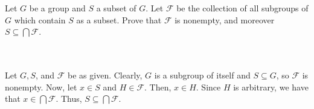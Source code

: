 Let $G$ be a group and $S$ a subset of $G$. Let $\mathcal{F}$ be the collection of all subgroups of $G$
which contain $S$ as a subset. Prove that $\mathcal{F}$ is nonempty, and moreover
$S\subseteq\bigcap\mathcal{F}$.\\\\

\begin{solution}\renewcommand{\qedsymbol}{}\ \\
    Let $G, S$, and $\mathcal{F}$ be as given. Clearly, $G$ is a subgroup of itself and $S\subseteq G$,
    so $\mathcal{F}$ is nonempty. Now, let $x\in S$ and $H\in\mathcal{F}$. Then, $x\in H$. Since $H$ is
    arbitrary, we have that $x\in\bigcap\mathcal{F}$. Thus, $S\subseteq\bigcap\mathcal{F}$.

\end{solution}